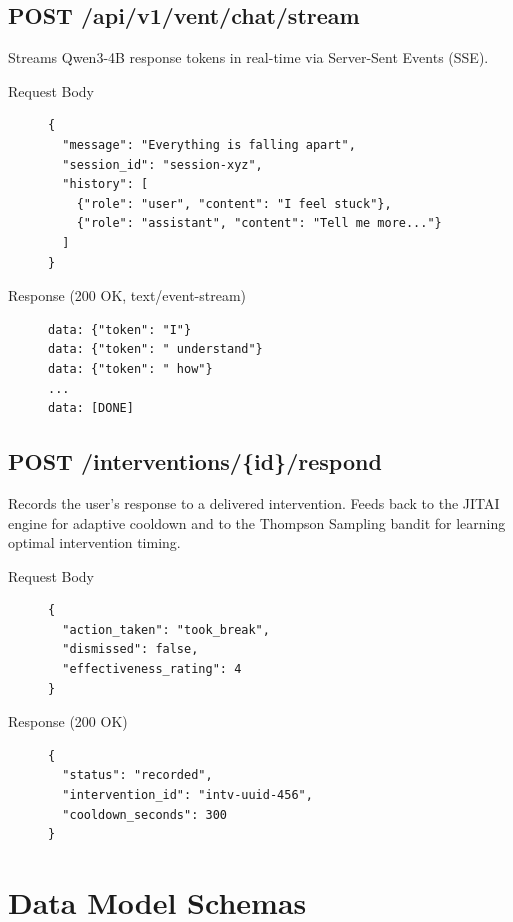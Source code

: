 \subsection{POST /api/v1/vent/chat/stream}

Streams Qwen3-4B response tokens in real-time via Server-Sent Events (SSE).

\begin{description}
  \item[Request Body] \hfill
\begin{lstlisting}
{
  "message": "Everything is falling apart",
  "session_id": "session-xyz",
  "history": [
    {"role": "user", "content": "I feel stuck"},
    {"role": "assistant", "content": "Tell me more..."}
  ]
}
\end{lstlisting}

  \item[Response (200 OK, text/event-stream)] \hfill
\begin{lstlisting}
data: {"token": "I"}
data: {"token": " understand"}
data: {"token": " how"}
...
data: [DONE]
\end{lstlisting}
\end{description}

\subsection{POST /interventions/\{id\}/respond}

Records the user's response to a delivered intervention. Feeds back to the JITAI engine for adaptive cooldown and to the Thompson Sampling bandit for learning optimal intervention timing.

\begin{description}
  \item[Request Body] \hfill
\begin{lstlisting}
{
  "action_taken": "took_break",
  "dismissed": false,
  "effectiveness_rating": 4
}
\end{lstlisting}

  \item[Response (200 OK)] \hfill
\begin{lstlisting}
{
  "status": "recorded",
  "intervention_id": "intv-uuid-456",
  "cooldown_seconds": 300
}
\end{lstlisting}
\end{description}

\section{Data Model Schemas}

